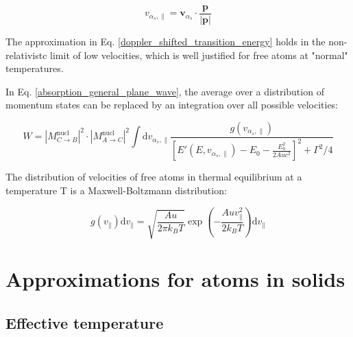 \documentclass{article}
\begin{document}
\begin{equation}
	\label{v_parallel}
	v_{\alpha_s, \parallel} = \mathbf{v}_{\alpha_s} \cdot \frac{\mathbf{p}}{\left| \mathbf{p} \right|}
\end{equation}

The approximation in Eq. \ref{doppler_shifted_transition_energy} holds in the non-relativistc limit of low velocities, which is well justified for free atoms at "normal" temperatures.

In Eq. \ref{absorption_general_plane_wave}, the average over a distribution of momentum states can be replaced by an integration over all possible velocities:

\begin{equation}
\label{absorption_plane_wave_v}
	W = \left| M^{\mathrm{nucl}}_{C \to B} \right|^2 \cdot \left| M^{\mathrm{nucl}}_{A \to C} \right|^2 \int \mathrm{d} v_{\alpha_s, \parallel}  \frac{g(v_{\alpha_s, \parallel})}{ \left[ E' (E, v_{\alpha_s, \parallel})- E_0 - \frac{E_0^2}{2 Auc^2} \right]^2 + \Gamma^2 / 4}
\end{equation}

The distribution of velocities of free atoms in thermal equilibrium at a temperature T is a Maxwell-Boltzmann distribution:

\begin{equation}
	\label{maxwell_boltzmann_distribution}
	g(v_\parallel) \mathrm{d} v_\parallel = \sqrt{\frac{A u}{2 \pi k_B T}} \exp{\left( - \frac{A u v_\parallel^2}{2 k_B T} \right)} \mathrm{d} v_\parallel
\end{equation}

\section{Approximations for atoms in solids}

\subsection{Effective temperature}


\end{document}
